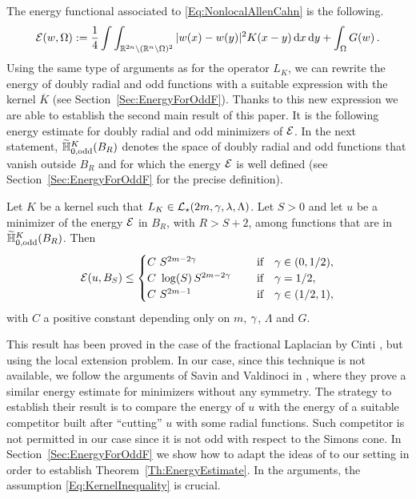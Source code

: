 
The energy functional associated to \eqref{Eq:NonlocalAllenCahn} is the following.
\begin{equation}
\label{Eq:Energy}
\mathcal{E}(w, \Omega) := \dfrac{1}{4}\int\int_{\mathbb{R}^{2n} \setminus (\mathbb{R}^n\setminus\Omega)^2} |w(x) - w(y)|^2 K(x-y) \,\mathrm{d} x \,\mathrm{d} y + \int_{\Omega} G(w)\,.
\end{equation}
Using the same type of arguments as for the operator $L_K$, we can rewrite the energy of doubly radial and odd functions with a suitable expression with the kernel $\overline{K}$ (see Section~\ref{Sec:EnergyForOddF}). Thanks to this new expression we are able to establish the second main result of this paper. It is the following energy estimate for doubly radial and odd minimizers of $\mathcal{E}$. In the next statement, $\widetilde{\mathbb{H}}^K_{0, \mathrm{odd}}(B_R)$ denotes the space of doubly radial and odd functions that vanish outside $B_R$ and for which the energy $\mathcal{E}$ is well defined (see Section~\ref{Sec:EnergyForOddF} for the precise definition).

\begin{theorem}
	\label{Th:EnergyEstimate} 
	Let $K$ be a kernel such that $L_K\in \mathcal{L}_\star(2m, \gamma, \lambda, \Lambda)$. Let $S>0$ and let $u$ be a minimizer of the energy $\mathcal{E}$ in $B_{R}$, with $R>S+2$, among functions that are in $\widetilde{\mathbb{H}}^K_{0, \mathrm{odd}}(B_R)$. Then
	$$ \mathcal{E} (u,B_S) \leq \begin{cases}
	C \ S^{2m-2\gamma}\ \ \ \ &\textrm{if } \ \ \gamma\in(0,1/2),\\
	C\ \log(S)\,S^{2m-2\gamma}\ \ \ \ &\textrm{if } \ \ \gamma=1/2,\\
	C \ S^{2m-1}\ \ \ \ &\textrm{if } \ \ \gamma\in(1/2,1),\\
	\end{cases} $$
	with $C$ a positive constant depending only on $m$, $\gamma$, $\Lambda$ and $G$.
\end{theorem}



This result has been proved in the case of the fractional Laplacian by Cinti \cite{Cinti-Saddle,Cinti-Saddle2}, but using the local extension problem. In our case, since this technique is not available, we follow the arguments of Savin and Valdinoci in \cite{SavinValdinoci-EnergyEstimate}, where they prove a similar energy estimate for minimizers without any symmetry. The strategy to establish their result is to compare the energy of $u$ with the energy of a suitable competitor built after ``cutting'' $u$ with some radial functions. Such competitor is not permitted in our case since it is not odd with respect to the Simons cone. In Section~\ref{Sec:EnergyForOddF} we show how to adapt the ideas of \cite{SavinValdinoci-EnergyEstimate} to our setting in order to establish Theorem~\ref{Th:EnergyEstimate}. In the arguments, the assumption \eqref{Eq:KernelInequality} is crucial.



